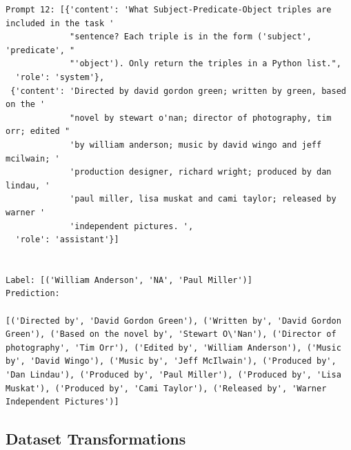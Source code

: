 \documentclass{article}
\begin{document}
\begin{lstlisting}
Prompt 12: [{'content': 'What Subject-Predicate-Object triples are included in the task '
             "sentence? Each triple is in the form ('subject', 'predicate', "
             "'object'). Only return the triples in a Python list.",
  'role': 'system'},
 {'content': 'Directed by david gordon green; written by green, based on the '
             "novel by stewart o'nan; director of photography, tim orr; edited "
             'by william anderson; music by david wingo and jeff mcilwain; '
             'production designer, richard wright; produced by dan lindau, '
             'paul miller, lisa muskat and cami taylor; released by warner '
             'independent pictures. ',
  'role': 'assistant'}]


Label: [('William Anderson', 'NA', 'Paul Miller')]
Prediction: 

[('Directed by', 'David Gordon Green'), ('Written by', 'David Gordon Green'), ('Based on the novel by', 'Stewart O\'Nan'), ('Director of photography', 'Tim Orr'), ('Edited by', 'William Anderson'), ('Music by', 'David Wingo'), ('Music by', 'Jeff McIlwain'), ('Produced by', 'Dan Lindau'), ('Produced by', 'Paul Miller'), ('Produced by', 'Lisa Muskat'), ('Produced by', 'Cami Taylor'), ('Released by', 'Warner Independent Pictures')]
\end{lstlisting}
\subsection{Dataset Transformations}\label{dataset_transform}
\end{document}
